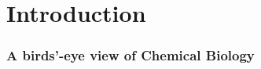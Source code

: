 \chapter{Introduction}
\label{introduction}
\newpage




\makeatletter
\newenvironment{figurehere}
{\def\@captype{figure}}
{}
\makeatother

\makeatletter
\newenvironment{Figure_modified}{%
\par\addvspace{12pt plus2pt}%
\def\@captype{figure}%
}{%
\par\addvspace{12pt plus2pt}%
}%


\long{}
\makeatother




\renewcommand{\thesubsection}{\thechapter.\arabic{subsection}}


\subsection{A birds'-eye view of Chemical Biology}
\label{Introduction_birds}

